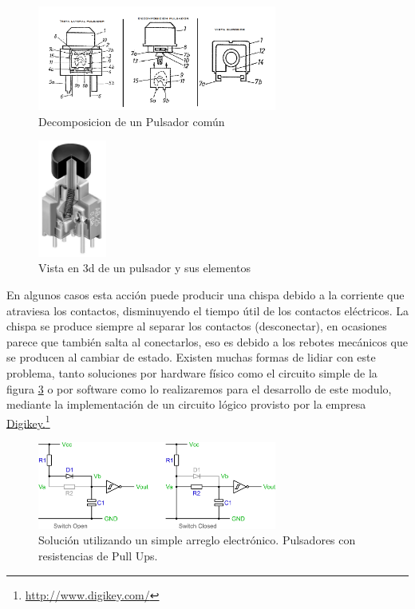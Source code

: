 \documentclass[paper=a4, fontsize=12pt]{article} 		%
\newcommand\fnurl[2]{%
\href{#2}{#1}\footnote{\url{#2}}%
}
\numberwithin{equation}{section}						%
\numberwithin{table}{section} 							%
\begin{document}
\begin{figure}[H]
  \centering
     \includegraphics[width=0.7\textwidth]{pulsadorinternals}
  \caption{Decomposicion de un Pulsador común}
      \label{fig:pulsadorinternal1}
\end{figure}
\begin{figure}[H]
  \centering
     \includegraphics[width=0.2\textwidth]{internal}
  \caption{Vista en 3d de un pulsador y sus elementos }
      \label{fig:pulsadorinternal2}
\end{figure}
\label{sec:pulsador} 
En algunos casos esta acción puede producir una chispa debido a la corriente que atraviesa los contactos, disminuyendo el tiempo útil de los contactos eléctricos. La chispa se produce siempre al separar los contactos (desconectar), en ocasiones parece que también salta al conectarlos, eso es debido a los rebotes mecánicos que se producen al cambiar de estado.
Existen muchas formas de lidiar con este problema, tanto soluciones por hardware físico como el circuito simple de la figura \ref{fig:hardwc} o por software como lo realizaremos para el desarrollo de este modulo, mediante la implementación de un circuito lógico provisto por la empresa \fnurl{Digikey.}{http://www.digikey.com/}\\
\begin{figure}[H]
  \centering
     \includegraphics[width=0.7\textwidth]{debounceCircuit2}
  \caption{Solución utilizando un simple arreglo electrónico. Pulsadores con resistencias de Pull Ups.}
      \label{fig:hardwc}
\end{figure}
\end{document}
